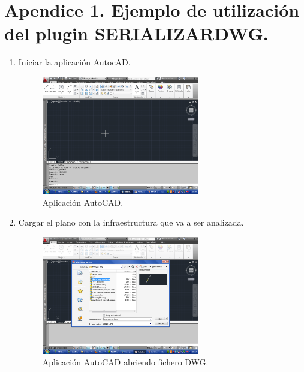 \section{Apendice 1. Ejemplo de utilización del plugin SERIALIZARDWG.}

\begin{enumerate}

\item{Iniciar la aplicación AutocAD.}

\begin{figure}[H]
\begin{center}
\includegraphics[width=0.65\textwidth]{imgs/autocad0}
\caption{Aplicación AutoCAD.}
\end{center}
\end{figure}

\item{Cargar el plano con la infraestructura que va a ser analizada.}

\begin{figure}[H]
\begin{center}
\includegraphics[width=0.65\textwidth]{imgs/autocad1}
\caption{Aplicación AutoCAD abriendo fichero DWG.}
\end{center}
\end{figure}


\end{enumerate}
